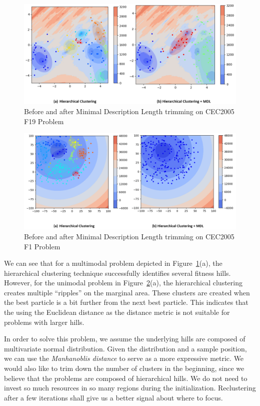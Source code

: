 \begin{figure}
\centering
\includegraphics[width=\textwidth]{MDL_comparison_F19}
\caption{Before and after Minimal Description Length trimming on CEC2005 F19 Problem}\label{fig:MDL_comparison_F19}
\end{figure}

\begin{figure} 
\centering
\includegraphics[width=\textwidth]{MDL_comparison}
\caption{Before and after Minimal Description Length trimming on CEC2005 F1 Problem}\label{fig:MDL_comparison}
\end{figure}

We can see that for a multimodal problem depicted in Figure~\ref{fig:MDL_comparison_F19}(a), 
the hierarchical clustering technique successfully identifies several fitness hills.
However, for the unimodal problem in Figure~\ref{fig:MDL_comparison}(a), 
the hierarchical clustering creates multiple ``ripples'' on the marginal area.
These clusters are created when the best particle is a bit further from the next best particle.
This indicates that the using the Euclidean distance as the distance metric is not suitable for problems with larger hills.

In order to solve this problem, we assume the underlying hills are composed of multivariate normal distribution.
Given the distribution and a sample position, we can use the \textit{Manhanoblis distance} to serve as a more expressive metric.
We would also like to trim down the number of clusters in the beginning, since we believe that the problems are composed of hierarchical hills.
We do not need to invest so much resources in so many regions during the initialization.
Reclustering after a few iterations shall give us a better signal about where to focus.


